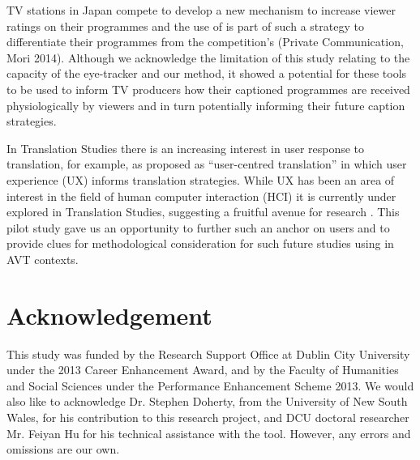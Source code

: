 \documentclass[output=paper]{langsci/langscibook}
\begin{document}
TV stations in Japan compete to develop a new mechanism to increase viewer ratings on their programmes and the use of  is part of such a strategy to differentiate their programmes from the competition's (Private Communication, Mori 2014). Although we acknowledge the limitation of this study relating to the capacity of the eye-tracker and our method, it showed a potential for these tools to be used to inform TV producers how their captioned programmes are received physiologically by viewers and in turn potentially informing their future caption strategies.  



In Translation Studies there is an increasing interest in user response to translation, for example, as proposed as ``user-centred translation'' \citep{Suojanen2015} in which user experience (UX) informs translation strategies. While UX has been an area of interest in the field of human computer interaction (HCI) it is currently under explored in Translation Studies, suggesting a fruitful avenue for research \citep[312--318]{ohagan2013}. This pilot study gave us an opportunity to further such an anchor on users and to provide clues for methodological consideration for such future studies using  in AVT contexts. 


\section*{Acknowledgement}

This study was funded by the Research Support Office at Dublin City University under the 2013 Career Enhancement Award, and by the Faculty of Humanities and Social Sciences under the Performance Enhancement Scheme 2013. We would also like to acknowledge Dr. Stephen Doherty, from the University of New South Wales, for his contribution to this research project, and DCU doctoral researcher Mr. Feiyan Hu for his technical assistance with the  tool. However, any errors and omissions are our own. 
\end{document}
